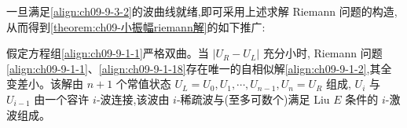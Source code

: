 \documentclass[../../main.tex]{subfiles}
\begin{document}
一旦满足\eqref{align:ch09-9-3-2}的波曲线就绪,即可采用上述求解 Riemann 问题的构造,从而得到\cref{theorem:ch09-小振幅riemann解}的如下推广:

\begin{theorem}\label{theorem:ch09-严格双曲riemann解}
假定方程组\eqref{align:ch09-9-1-1}严格双曲。当 $|U_{R}-U_{L}|$ 充分小时, Riemann 问题\eqref{align:ch09-9-1-1}、\eqref{align:ch09-9-1-18}存在唯一的自相似解\eqref{align:ch09-9-1-2},其全变差小。该解由 $n+1$ 个常值状态 $U_{L}=U_{0},U_{1},\cdots ,U_{n-1},U_{n}=U_{R}$ 组成, $U_{i}$ 与 $U_{i-1}$ 由一个容许 $i$-波连接,该波由 $i$-稀疏波与(至多可数个)满足 Liu $E$ 条件的 $i$-激波组成。
\end{theorem}
\end{document}
